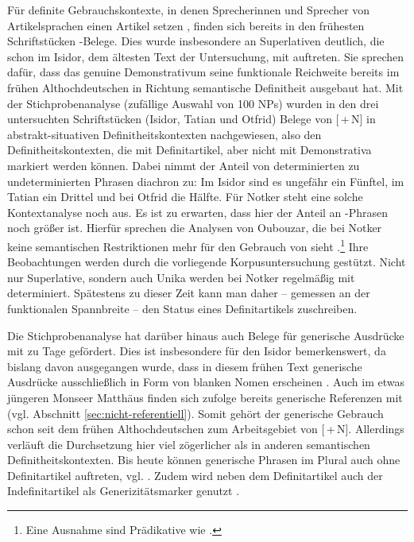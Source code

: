 Für definite Gebrauchskontexte, in denen Sprecherinnen und Sprecher von Artikelsprachen einen Artikel setzen  \parencite[832]{Himmelmann2001}, finden sich bereits in den frühesten Schriftstücken  -Belege. Dies wurde insbesondere an Superlativen deutlich, die schon im Isidor, dem ältesten Text der Untersuchung, mit  auftreten. Sie sprechen dafür, dass das genuine Demonstrativum seine funktionale Reichweite bereits im frühen Althochdeutschen in Richtung semantische Definitheit ausgebaut hat. Mit der Stichprobenanalyse (zufällige Auswahl von 100 NPs) wurden in den drei untersuchten Schriftstücken (Isidor, Tatian und Otfrid) Belege von [\,+\,N] in abstrakt-situativen Definitheitskontexten nachgewiesen, also den Definitheitskontexten, die mit Definitartikel, aber nicht mit Demonstrativa markiert werden können. Dabei nimmt der Anteil von determinierten zu undeterminierten Phrasen diachron zu: Im Isidor sind es ungefähr ein Fünftel, im Tatian ein Drittel und bei Otfrid die Hälfte. Für Notker steht eine solche Kontextanalyse noch aus. Es ist zu erwarten, dass hier der Anteil an -Phrasen noch größer ist. Hierfür sprechen die Analysen von Oubouzar, die bei Notker keine semantischen Restriktionen mehr für den Gebrauch von  sieht \parencite[573]{Oubouzar1989}.\footnote{Eine Ausnahme sind Prädikative wie .} Ihre Beobachtungen werden durch die vorliegende Korpusuntersuchung gestützt. Nicht nur Superlative, sondern auch Unika werden bei Notker regelmäßig mit  determiniert. Spätestens zu dieser Zeit kann man daher -- gemessen an der funktionalen Spannbreite --  den Status eines Definitartikels zuschreiben. 

Die Stichprobenanalyse hat darüber hinaus auch Belege für generische Ausdrücke mit  zu Tage gefördert. Dies ist insbesondere für den Isidor bemerkenswert, da bislang davon ausgegangen wurde, dass in diesem frühen Text generische Ausdrücke ausschließlich in Form von blanken Nomen erscheinen \parencites()()[80]{Oubouzar1992}[145]{Kraiss2012}. Auch im etwas jüngeren Monseer Matthäus finden sich \textcite{Hodler1954} zufolge bereits generische Referenzen mit  (vgl. Abschnitt \ref{sec:nicht-referentiell}). Somit gehört der generische Gebrauch schon seit dem frühen Althochdeutschen zum Arbeitsgebiet von [\,+\,N].  Allerdings verläuft die Durchsetzung hier viel zögerlicher als in anderen semantischen Definitheitskontexten. Bis heute können generische Phrasen im  Plural auch ohne Definitartikel auftreten, vgl.  \parencite[][145]{Barton2015}. Zudem wird neben dem Definitartikel auch der Indefinitartikel als Generizitätsmarker genutzt \parencite{Petrova2020}.

